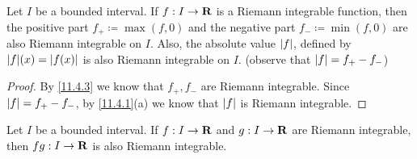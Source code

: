 \begin{corollary}\label{11.4.4}
  \quad
  Let \(I\) be a bounded interval.
  If \(f : I \to \mathbf{R}\) is a Riemann integrable function, then the positive part \(f_+ \coloneqq \max(f, 0)\) and the negative part \(f_- \coloneqq \min(f, 0)\) are also Riemann integrable on \(I\).
  Also, the absolute value \(\left\lvert f\right\rvert\), defined by \(\abs{f}(x) = \abs{f(x)}\) is also Riemann integrable on \(I\).
  (observe that \(\left\lvert f\right\rvert = f_+ - f_-\))
\end{corollary}

\begin{proof}
  By \cref{11.4.3} we know that \(f_+, f_-\) are Riemann integrable.
  Since \(\left\lvert f\right\rvert = f_+ - f_-\), by \cref{11.4.1}(a) we know that \(\left\lvert f\right\rvert\) is Riemann integrable.
\end{proof}

\begin{theorem}\label{11.4.5}
  Let \(I\) be a bounded interval.
  If \(f : I \to \mathbf{R}\) and \(g : I \to \mathbf{R}\) are Riemann integrable, then \(fg : I \to \mathbf{R}\) is also Riemann integrable.
\end{theorem}

